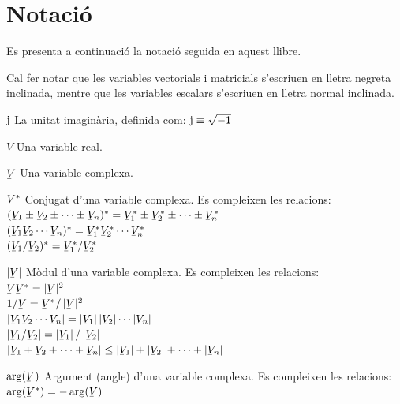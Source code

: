 \chapter*{Notaci\'{o}} 

Es presenta a continuaci\'{o} la notaci\'{o} seguida en aquest llibre.

Cal fer notar que les variables vectorials i matricials s'escriuen
en lletra negreta inclinada,  mentre que les variables escalars
s'escriuen en lletra normal inclinada.

\begin{list}{}
{\setlength{\labelwidth}{15mm} \setlength{\leftmargin}{20mm}
\setlength{\labelsep}{5mm}}
    \item[$\mathrm{j}$] La unitat imagin\`{a}ria, definida com:
    $\mathrm{j}\equiv\sqrt{-1}$
    \item[$V$] Una variable real.
    \item[$\cmplx{V}$] Una variable complexa.
    \item[$\cmplx{V}^*$] Conjugat d'una variable complexa.
    Es compleixen les relacions:\\[1ex]
     $(\cmplx{V}_1 \pm \cmplx{V}_2 \pm \cdots  \pm \cmplx{V}_n)^* = \cmplx{V}_1^* \pm
    \cmplx{V}_2^*\pm\cdots\pm\cmplx{V}_n^*$\\[1ex]
    $(\cmplx{V}_1 \cmplx{V}_2 \cdots \cmplx{V}_n)^* = \cmplx{V}_1^*  \cmplx{V}_2^*
    \cdots \cmplx{V}_n^*$\\[1ex]
    $(\cmplx{V}_1 / \cmplx{V}_2)^* = \cmplx{V}_1^* / \cmplx{V}_2^*$
    \item[$|\cmplx{V}|$] M\`{o}dul d'una variable complexa.
    Es compleixen les relacions:\\[1ex]
      $\cmplx{V}\cmplx{V}^* = |\cmplx{V}|^2$\\[1ex]
      $1/ \cmplx{V} = \cmplx{V}^* / \,|\cmplx{V}|^2$\\[1ex]
      $|\cmplx{V}_1 \cmplx{V}_2 \cdots \cmplx{V}_n| =
       |\cmplx{V}_1| \,|\cmplx{V}_2| \cdots |\cmplx{V}_n|$\\[1ex]
       $|\cmplx{V}_1 / \cmplx{V}_2| = |\cmplx{V}_1| \,/ \,|\cmplx{V}_2|$\\[1ex]
      $|\cmplx{V}_1+\cmplx{V}_2+\cdots+\cmplx{V}_n| \leq
      |\cmplx{V}_1| + |\cmplx{V}_2| + \cdots  +|\cmplx{V}_n|$
    \item[$\arg(\cmplx{V})$] Argument (angle) d'una variable complexa.
     Es compleixen les relacions:\\[1ex]
      $\arg(\cmplx{V}^*) = - \arg(\cmplx{V})$\\[1ex]

\end{list}
